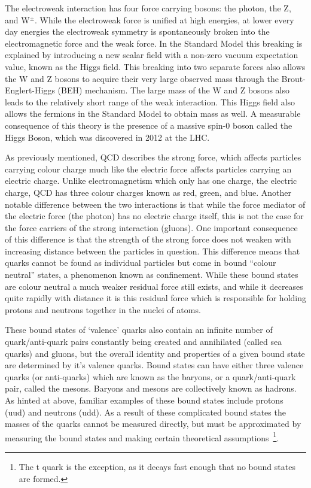 The electroweak interaction has four force carrying bosons: the photon, the Z, and W$^{\pm}$.  
While the electroweak force is unified at high energies, at lower every day energies the electroweak symmetry is spontaneously broken into the electromagnetic force and the weak force.  
In the Standard Model this breaking is explained by introducing a new scalar field with a non-zero vacuum expectation value, known as the Higgs field.  
This breaking into two separate forces also allows the W and Z bosons to acquire their very large observed mass through the Brout-Englert-Higgs (BEH) mechanism.  
The large mass of the W and Z bosons also leads to the relatively short range of the weak interaction.  
This Higgs field also allows the fermions in the Standard Model to obtain mass as well.  
A measurable consequence of this theory is the presence of a massive spin-0 boson called the Higgs Boson, which was discovered in 2012 at the \gls{LHC}.  

As previously mentioned, \gls{QCD} describes the strong force, which affects particles carrying colour charge much like the electric force affects particles carrying an electric charge.  
Unlike electromagnetism which only has one charge, the electric charge, \gls{QCD} has three colour charges known as red, green, and blue.  
Another notable difference between the two interactions is that while the force mediator of the electric force (the photon) has no electric charge itself, this is not the case for the force carriers of the strong interaction (gluons).  
One important consequence of this difference is that the strength of the strong force does not weaken with increasing distance between the particles in question.  
This difference means that quarks cannot be found as individual particles but come in bound ``colour neutral'' states, a phenomenon known as confinement.  
While these bound states are colour neutral a much weaker residual force still exists, and while it decreases quite rapidly with distance it is this residual force which is responsible for holding protons and neutrons together in the nuclei of atoms.  

These bound states of `valence' quarks also contain an infinite number of quark/anti-quark pairs constantly being created and annihilated (called sea quarks) and gluons, but the overall identity and properties of a given bound state are determined by it's valence quarks.  
Bound states can have either three valence quarks (or anti-quarks) which are known as the baryons, or a quark/anti-quark pair, called the mesons.  
Baryons and mesons are collectively known as hadrons.  
As hinted at above, familiar examples of these bound states include protons (uud) and neutrons (udd).  
As a result of these complicated bound states the masses of the quarks cannot be measured directly, but must be approximated by measuring the bound states and making certain theoretical assumptions~\footnote{The t quark is the exception, as it decays fast enough that no bound states are formed.}.
 

